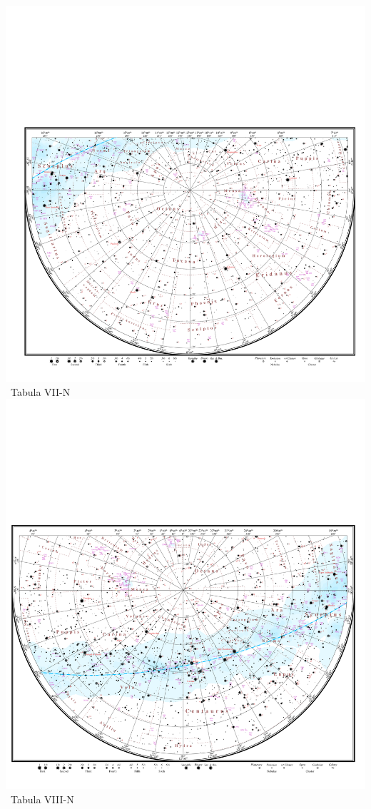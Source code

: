 \documentclass[10pt,landscape,oneside]{article}
\begin{document}
\begin{center}
\noindent\includegraphics[height=\textheight,trim= 0.0cm -0.5cm 0.0cm 13.85cm,clip]{TabulaVII.pdf}\\[-1.025\textheight]\hfill\large~Tabula VII-N\hspace{18mm}
\clearpage
%
\noindent\includegraphics[height=\textheight,trim= 0.0cm -0.5cm 0.0cm 13.85cm,clip]{TabulaVIII.pdf}\\[-1.025\textheight]\hfill\large~Tabula VIII-N\hspace{25mm}


\end{center}
\end{document}
